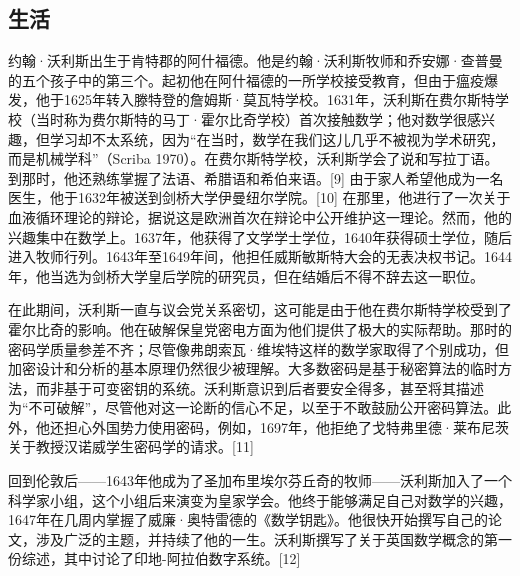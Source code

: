 \subsection{生活}
约翰·沃利斯出生于肯特郡的阿什福德。他是约翰·沃利斯牧师和乔安娜·查普曼的五个孩子中的第三个。起初他在阿什福德的一所学校接受教育，但由于瘟疫爆发，他于1625年转入滕特登的詹姆斯·莫瓦特学校。1631年，沃利斯在费尔斯特学校（当时称为费尔斯特的马丁·霍尔比奇学校）首次接触数学；他对数学很感兴趣，但学习却不太系统，因为“在当时，数学在我们这儿几乎不被视为学术研究，而是机械学科”（Scriba 1970）。在费尔斯特学校，沃利斯学会了说和写拉丁语。到那时，他还熟练掌握了法语、希腊语和希伯来语。[9] 由于家人希望他成为一名医生，他于1632年被送到剑桥大学伊曼纽尔学院。[10] 在那里，他进行了一次关于血液循环理论的辩论，据说这是欧洲首次在辩论中公开维护这一理论。然而，他的兴趣集中在数学上。1637年，他获得了文学学士学位，1640年获得硕士学位，随后进入牧师行列。1643年至1649年间，他担任威斯敏斯特大会的无表决权书记。1644年，他当选为剑桥大学皇后学院的研究员，但在结婚后不得不辞去这一职位。

在此期间，沃利斯一直与议会党关系密切，这可能是由于他在费尔斯特学校受到了霍尔比奇的影响。他在破解保皇党密电方面为他们提供了极大的实际帮助。那时的密码学质量参差不齐；尽管像弗朗索瓦·维埃特这样的数学家取得了个别成功，但加密设计和分析的基本原理仍然很少被理解。大多数密码是基于秘密算法的临时方法，而非基于可变密钥的系统。沃利斯意识到后者要安全得多，甚至将其描述为“不可破解”，尽管他对这一论断的信心不足，以至于不敢鼓励公开密码算法。此外，他还担心外国势力使用密码，例如，1697年，他拒绝了戈特弗里德·莱布尼茨关于教授汉诺威学生密码学的请求。[11]

回到伦敦后——1643年他成为了圣加布里埃尔芬丘奇的牧师——沃利斯加入了一个科学家小组，这个小组后来演变为皇家学会。他终于能够满足自己对数学的兴趣，1647年在几周内掌握了威廉·奥特雷德的《数学钥匙》。他很快开始撰写自己的论文，涉及广泛的主题，并持续了他的一生。沃利斯撰写了关于英国数学概念的第一份综述，其中讨论了印地-阿拉伯数字系统。[12]